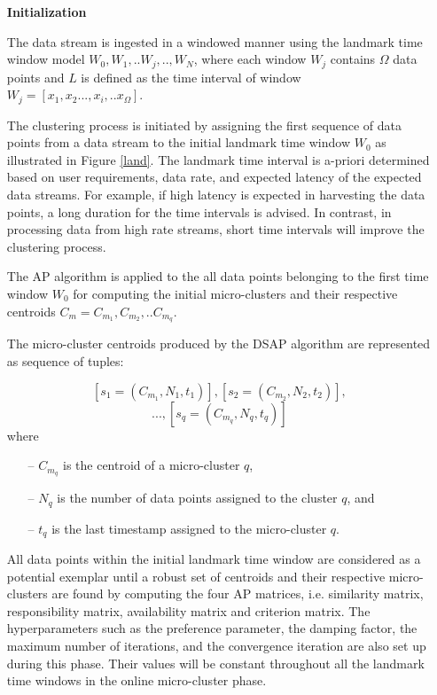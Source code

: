 \begin{itemize}[leftmargin=*]
  

\item[]\textbf{Initialization}


The data stream is ingested in a windowed manner using the landmark time window model $W_0, W_1, ..W_j, ..,W_N $, where each window $W_j$ contains $\Omega$ data points and $L$ is defined as the time interval of window $W_j = [x_1,x_2...,x_i,..x_{\Omega}]$.

The clustering process is initiated by assigning the first sequence of data points from a data stream to the initial landmark time window $W_0$ as illustrated in Figure \ref{land}. The landmark time interval is a-priori determined based on user requirements, data rate, and expected latency of the expected data streams. For example, if high latency is expected in harvesting the data points, a long duration for the time intervals is advised. In contrast, in processing data from high rate streams, short time intervals will improve the clustering process. 

The AP algorithm is applied to the all data points belonging to the first time window $W_0$ for computing the initial micro-clusters and their respective centroids $C_m = C_{m_1}, C_{m_2},..C_{m_q}$. 

The micro-cluster centroids produced by the DSAP algorithm are represented as sequence of tuples:
    
    \[    \left [  s_{1} =\left ( C_{m_1},N_{1},t_{1} \right )  \right ], \left [ s_{2} = \left ( C_{m_2},N_{2}, t_{2} \right ) \right ],\]
    \[...,\left [ s_q = \left ( C_{m_q}, N_q, t_{q} \right ) \right ] \]  
    where
    \begin{itemize}
        \item[--] $C_{m_q}$ is the centroid of a micro-cluster $q$,
        \item[--] $N_q$ is the number of data points assigned to the cluster $q$, and
        \item[--] $t_{q}$ is the last timestamp assigned to the micro-cluster $q$.
    \end{itemize}

All data points within the initial landmark time window are considered as a potential exemplar until a robust set of centroids and their respective micro-clusters are found by computing the four AP matrices, i.e. similarity matrix, responsibility matrix, availability matrix and criterion matrix. The hyperparameters such as the preference parameter, the damping factor, the maximum number of iterations, and the convergence iteration are also set up during this phase. Their values will be constant throughout all the landmark time windows in the online micro-cluster phase.


\end{itemize}
